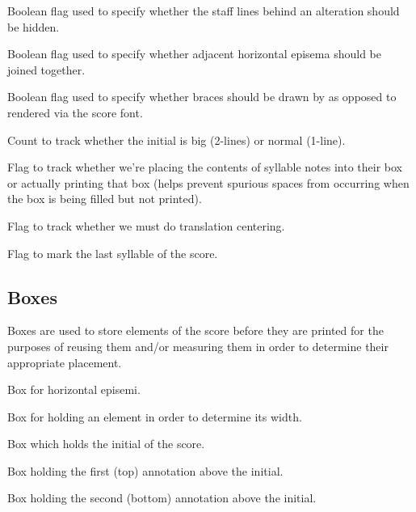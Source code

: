 Boolean flag used to specify whether the staff lines behind an alteration should be hidden.

Boolean flag used to specify whether adjacent horizontal episema should be joined together.

Boolean flag used to specify whether braces should be drawn by \MP{} as
opposed to rendered via the score font.

Count to track whether the initial is big (2-lines) or normal (1-line).

Flag to track whether we're placing the contents of syllable notes into their box or actually printing that box (helps prevent spurious spaces from occurring when the box is being filled but not printed).

Flag to track whether we must do translation centering.

Flag to mark the last syllable of the score.



\subsection{Boxes}

Boxes are used to store elements of the score before they are printed for the purposes of reusing them and/or measuring them in order to determine their appropriate placement.

Box for horizontal episemi.

Box for holding an element in order to determine its width.

Box which holds the initial of the score.

Box holding the first (top) annotation above the initial.

Box holding the second (bottom) annotation above the initial.

